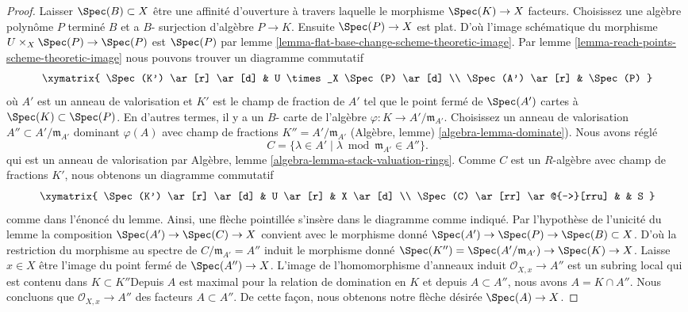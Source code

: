 \begin{proof}
Laisser $\Spec(B) \subset X$ être une affinité d'ouverture à travers laquelle le morphisme $\Spec(K) \to X$ facteurs. Choisissez une algèbre polynôme $P$ terminé $B$ et a $B$- surjection d'algèbre $P \to K$. Ensuite $\Spec(P) \to X$ est plat. D'où l'image schématique du morphisme $U \times_X \Spec(P) \to \Spec(P)$ est $\Spec(P)$ par lemme \ref{lemma-flat-base-change-scheme-theoretic-image}. Par lemme \ref{lemma-reach-points-scheme-theoretic-image}
nous pouvons trouver un diagramme commutatif
$$
\xymatrix{
\Spec(K') \ar[r] \ar[d] & U \times_X \Spec(P) \ar[d] \\
\Spec(A') \ar[r] & \Spec(P)
}
$$
où $A'$ est un anneau de valorisation et $K'$ est le champ de fraction de $A'$
tel que le point fermé de $\Spec(A')$ cartes à $\Spec(K) \subset \Spec(P)$. En d'autres termes, il y a un $B$- carte de l'algèbre
$\varphi : K \to A'/\mathfrak m_{A'}$. Choisissez un anneau de valorisation
$A'' \subset A'/\mathfrak m_{A'}$ dominant $\varphi(A)$ avec champ de fractions $K'' = A'/\mathfrak m_{A'}$
(Algèbre, lemme) \ref{algebra-lemma-dominate}). Nous avons réglé
$$
C = \{\lambda \in A' \mid \lambda \bmod \mathfrak m_{A'} \in A''\}.
$$
qui est un anneau de valorisation par Algèbre, lemme \ref{algebra-lemma-stack-valuation-rings}. Comme $C$ est un $R$-algèbre avec champ de fractions $K'$, nous obtenons un diagramme commutatif
$$
\xymatrix{
\Spec(K') \ar[r] \ar[d] & U \ar[r] & X \ar[d] \\
\Spec(C) \ar[rr] \ar@{-->}[rru] & & S
}
$$
comme dans l'énoncé du lemme. Ainsi, une flèche pointillée s'insère dans le diagramme comme indiqué. Par l'hypothèse de l'unicité du lemme la composition $\Spec(A') \to \Spec(C) \to X$ convient avec le morphisme donné $\Spec(A') \to \Spec(P) \to \Spec(B) \subset X$. D'où la restriction du morphisme au spectre de
$C/\mathfrak m_{A'} = A''$ induit le morphisme donné
$\Spec(K'') = \Spec(A'/\mathfrak m_{A'}) \to \Spec(K) \to X$. Laisse $x \in X$ être l'image du point fermé de $\Spec(A'') \to X$. L'image de l'homomorphisme d'anneaux induit $\mathcal{O}_{X, x} \to A''$
est un subring local qui est contenu dans $K \subset K''$Depuis $A$ est maximal pour la relation de domination en $K$
et depuis $A \subset A''$, nous avons $A = K \cap A''$. Nous concluons que $\mathcal{O}_{X, x} \to A''$ des facteurs $A \subset A''$. De cette façon, nous obtenons notre flèche désirée $\Spec(A) \to X$.

\medskip\noindent


\end{proof}
